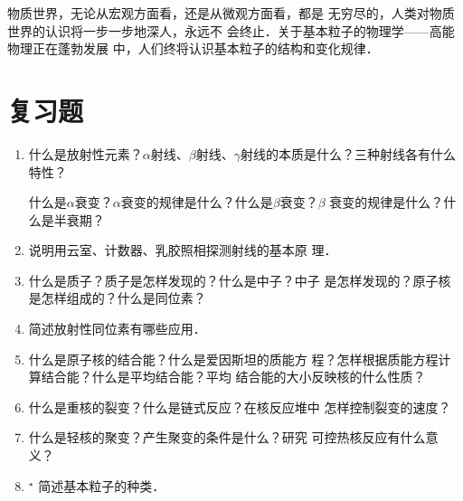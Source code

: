 物质世界，无论从宏观方面看，还是从微观方面看，都是
无穷尽的，人类对物质世界的认识将一步一步地深人，永远不
会终止．关于基本粒子的物理学——高能物理正在蓬勃发展
中，人们终将认识基本粒子的结构和变化规律．


\section*{复习题}
\begin{enumerate}
    \item 什么是放射性元素？$\alpha$射线、$\beta$射线、$\gamma$射线的本质是什么？三种射线各有什么特性？

    什么是$\alpha$衰变？$\alpha$衰变的规律是什么？什么是$\beta$衰变？$\beta$
    衰变的规律是什么？什么是半衰期？
    \item 说明用云室、计数器、乳胶照相探测射线的基本原
    理．
    \item 什么是质子？质子是怎样发现的？什么是中子？中子
    是怎样发现的？原子核是怎样组成的？什么是同位素？
    \item 简述放射性同位素有哪些应用．
    \item 什么是原子核的结合能？什么是爱因斯坦的质能方
    程？怎样根据质能方程计算结合能？什么是平均结合能？平均
    结合能的大小反映核的什么性质？
    \item 什么是重核的裂变？什么是链式反应？在核反应堆中
    怎样控制裂变的速度？
    \item 什么是轻核的聚变？产生聚变的条件是什么？研究
    可控热核反应有什么意义？
    \item$^\star$ 简述基本粒子的种类．
\end{enumerate}



